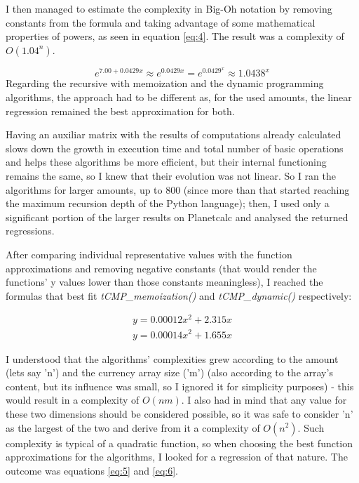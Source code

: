 \documentclass[shortpaper]{revdetua}
\begin{document}
I then managed to estimate the complexity in Big-Oh notation by removing
constants from the formula and taking advantage of some mathematical properties 
of powers, as seen in equation \ref{eq:4}.
The result was a complexity of $O(1.04^{n})$.

{
\begin{equation} \label{eq:4}
    e^{7.00+0.0429x} \approx e^{0.0429x} = e^{0.0429^{x}} \approx 1.0438^{x} 
\end{equation}
}
Regarding the recursive with memoization and the dynamic programming algorithms,
the approach had to be different as, for the used amounts, the linear regression 
remained the best approximation for both.

Having an auxiliar matrix with the results of computations already calculated 
slows down the growth in execution time and total number of basic operations and
helps these algorithms be more efficient, but their internal functioning remains
the same, so I knew that their evolution was not linear.
So I ran the algorithms for larger amounts, up to 800 (since more than that
started reaching the maximum recursion depth of the Python language); then,
I used only a significant portion of the larger results on Planetcalc and
analysed the returned regressions.

After comparing individual representative values with the function 
approximations and removing negative constants (that would render the 
functions' y values lower than those constants meaningless), I reached the 
formulas that best fit {\it tCMP\_memoization()\/} and {\it tCMP\_dynamic()\/} 
respectively:

{
\begin{align} 
    y = 0.00012x^{2}+2.315x \label{eq:5} \\
    y = 0.00014x^{2}+1.655x \label{eq:6}
\end{align}
}

\newpage
I understood that the algorithms' complexities grew according to the amount 
(lets say 'n') and the currency array size ('m') (also according to the array's 
content, but its influence was small, so I ignored it for simplicity purposes) - 
this would result in a complexity of $O(nm)$. 
I also had in mind that any value for these two dimensions should be 
considered possible, so it was safe to consider 'n' as the largest of the two 
and derive from it a complexity of $O(n^{2})$.
Such complexity is typical of a quadratic function, so when choosing the best 
function approximations for the algorithms, I looked for a regression of that
nature. The outcome was equations \ref{eq:5} and \ref{eq:6}.
\end{document}
